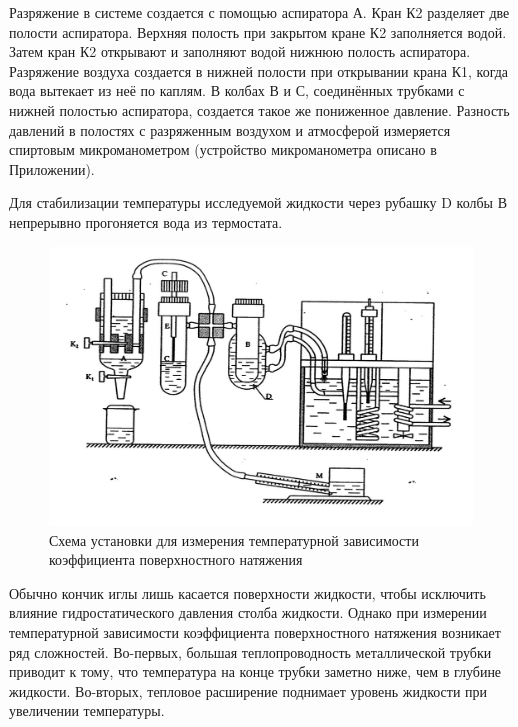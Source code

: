 \documentclass[a4paper]{article}
\begin{document}
Разряжение в системе создается с помощью аспиратора А. Кран К2 разделяет две полости аспиратора. Верхняя полость при закрытом кране К2  заполняется водой. Затем кран К2 открывают и заполняют водой  нижнюю полость  аспиратора.  Разряжение воздуха создается в нижней полости  при открывании крана К1, когда  вода вытекает из неё по каплям. В колбах В и С, соединённых трубками с нижней полостью аспиратора,  создается такое же пониженное давление. Разность давлений в полостях с разряженным воздухом и атмосферой измеряется спиртовым микроманометром (устройство микроманометра описано в Приложении).  

Для стабилизации температуры исследуемой жидкости через рубашку D колбы В непрерывно прогоняется вода из термостата. 
\begin{figure}[H]
        \centering
        \includegraphics[scale=0.8]{pic1.jpg}
        \caption{
        Схема установки для измерения температурной зависимости 
        коэффициента поверхностного натяжения
        }
 \end{figure} 
Обычно кончик иглы лишь касается поверхности жидкости, чтобы исключить влияние гидростатического давления столба жидкости. Однако при измерении температурной зависимости коэффициента поверхностного натяжения возникает ряд сложностей. Во-первых, большая теплопроводность металлической трубки приводит к тому, что температура на конце трубки заметно ниже, чем в глубине жидкости. Во-вторых, тепловое расширение поднимает уровень жидкости при увеличении температуры.  
\end{document}
